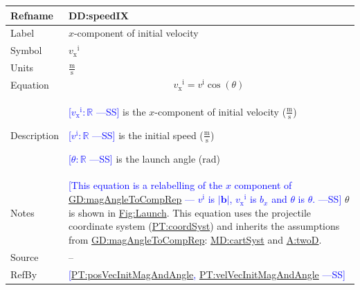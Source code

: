 \documentclass[12pt]{article}
\newcommand{\authornote}[3]{\textcolor{#1}{[#3 ---#2]}}
\newcommand{\authornote}[3]{}
\newcommand{\wss}[1]{\authornote{blue}{SS}{#1}}
\begin{document}
\medskip
\noindent
\begin{minipage}{\textwidth}
\begin{tabular}{>{\raggedright}p{}>{\raggedright\arraybackslash}p{}}
\toprule \textbf{Refname} & \textbf{DD:speedIX}
\label{DD:speedIX}
\\ \midrule
Label & $x$-component of initial velocity
        
\\ \midrule
Symbol & ${{v_{\text{x}}}^{\text{i}}}$
         
\\ \midrule
Units & $\frac{\text{m}}{\text{s}}$
        
\\ \midrule
Equation & \begin{displaymath}
           {{v_{\text{x}}}^{\text{i}}}={v^{\text{i}}} \cos\left(θ\right)
           \end{displaymath}
\\ \midrule
Description & \begin{symbDescription}
              \item{\wss{${{v_{\text{x}}}^{\text{i}}}: \mathbb{R}$} is the $x$-component of initial velocity ($\frac{\text{m}}{\text{s}}$)}
              \item{\wss{${v^{\text{i}}}: \mathbb{R}$} is the initial speed ($\frac{\text{m}}{\text{s}}$)}
              \item{\wss{$θ: \mathbb{R}$} is the launch angle (${\text{rad}}$)}
              \end{symbDescription}
\\ \midrule
Notes & \wss{This equation is a relabelling of the $x$ component of
\hyperref[GD:magAngleToCompRep]{GD:magAngleToCompRep} --- ${v^{\text{i}}}$ is
$|\symbf{b}|$, ${v_{\text{x}}}^{\text{i}}$ is $b_x$ and $\theta$ is $\theta$.}
$θ$ is shown in \hyperref[Figure:Launch]{Fig:Launch}.  This equation uses the
projectile coordinate system (\hyperref[PT:coordSyst]{PT:coordSyst}) and
inherits the assumptions from
\hyperref[GD:magAngleToCompRep]{GD:magAngleToCompRep}:
\hyperref[MD:cartSyst]{MD:cartSyst} and \hyperref[twoD]{A:twoD}.
        
\\ \midrule
Source & --
         
\\ \midrule
RefBy & \wss{\hyperref[PT:posVecInitMagAndAngle]{PT:posVecInitMagAndAngle},
\hyperref[PT:velVecInitMagAndAngle]{PT:velVecInitMagAndAngle}}
        
\\ \bottomrule
\end{tabular}
\end{minipage}
~\\
\end{document}
